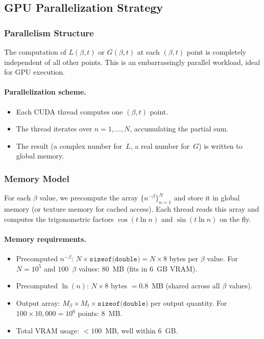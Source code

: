 \subsection{GPU Parallelization Strategy}
\label{sec:gpu}

\subsubsection{Parallelism Structure}
\label{sec:parallel}

The computation of $L(\beta, t)$ or $G(\beta, t)$ at each $(\beta, t)$ point is
completely independent of all other points. This is an embarrassingly parallel workload,
ideal for GPU execution.

\paragraph{Parallelization scheme.}
\begin{itemize}
  \item Each CUDA thread computes one $(\beta, t)$ point.
  \item The thread iterates over $n = 1, \ldots, N$, accumulating the partial sum.
  \item The result (a complex number for~$L$, a real number for~$G$) is written to global
        memory.
\end{itemize}

\subsubsection{Memory Model}
\label{sec:memory}

For each $\beta$ value, we precompute the array $\{n^{-\beta}\}_{n=1}^{N}$ and store it
in global memory (or texture memory for cached access). Each thread reads this array and
computes the trigonometric factors $\cos(t\ln n)$ and $\sin(t\ln n)$ on the fly.

\paragraph{Memory requirements.}
\begin{itemize}
  \item Precomputed $n^{-\beta}$: $N \times \texttt{sizeof(double)} = N \times 8$ bytes
        per $\beta$ value. For $N = 10^5$ and $100$~$\beta$ values: $80$~MB (fits in
        $6$~GB VRAM).
  \item Precomputed $\ln(n)$: $N \times 8$ bytes $= 0.8$~MB (shared across all $\beta$
        values).
  \item Output array: $M_\beta \times M_t \times \texttt{sizeof(double)}$ per output
        quantity. For $100 \times 10{,}000 = 10^6$ points: $8$~MB.
  \item Total VRAM usage: $< 100$~MB, well within $6$~GB.
\end{itemize}

